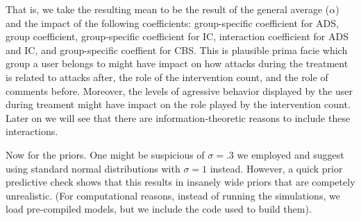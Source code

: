 \documentclass[10pt,dvipsnames,enabledeprecatedfontcommands]{scrartcl}
\begin{document}
That is, we take the resulting mean to be the result of the general
average (\(\alpha\)) and the impact of the following coefficients:
group-specific coefficient for \textsf{ADS}, group coefficient,
group-specific coefficient for \textsf{IC}, interaction coefficient for
\textsf{ADS} and \textsf{IC}, and group-specific coeffient for
\textsf{CBS}. This is plausible prima facie which group a user belongs
to might have impact on how attacks during the treatment is related to
attacks after, the role of the intervention count, and the role of
comments before. Moreover, the levels of agressive behavior displayed by
the user during treament might have impact on the role played by the
intervention count. Later on we will see that there are
information-theoretic reasons to include these interactions.

Now for the priors. One might be suspicious of \(\sigma =.3\) we
employed and suggest using standard normal distributions with
\(\sigma = 1\) instead. However, a quick prior predictive check shows
that this results in insanely wide priors that are competely
unrealistic. (For computational reasons, instead of running the
simulations, we load pre-compiled models, but we include the code used
to build them).

\vspace{1mm}
\footnotesize
\end{document}
